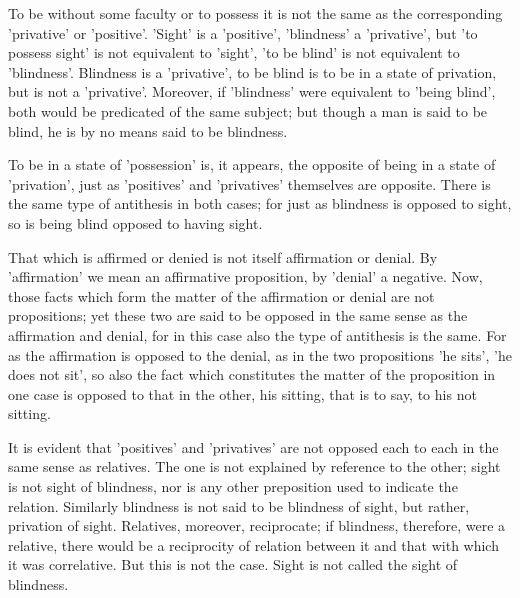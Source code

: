 To be without some faculty or to possess it is not the same as the
corresponding 'privative' or 'positive'. 'Sight' is a 'positive',
'blindness' a 'privative', but 'to possess sight' is not equivalent to
'sight', 'to be blind' is not equivalent to 'blindness'. Blindness is a
'privative', to be blind is to be in a state of privation, but is not a
'privative'. Moreover, if 'blindness' were equivalent to 'being blind',
both would be predicated of the same subject; but though a man is said
to be blind, he is by no means said to be blindness.

To be in a state of 'possession' is, it appears, the opposite of being
in a state of 'privation', just as 'positives' and 'privatives'
themselves are opposite. There is the same type of antithesis in both
cases; for just as blindness is opposed to sight, so is being blind
opposed to having sight.

That which is affirmed or denied is not itself affirmation or denial.
By 'affirmation' we mean an affirmative proposition, by 'denial' a
negative. Now, those facts which form the matter of the affirmation or
denial are not propositions; yet these two are said to be opposed in
the same sense as the affirmation and denial, for in this case also the
type of antithesis is the same. For as the affirmation is opposed to
the denial, as in the two propositions 'he sits', 'he does not sit', so
also the fact which constitutes the matter of the proposition in one
case is opposed to that in the other, his sitting, that is to say, to
his not sitting.

It is evident that 'positives' and 'privatives' are not opposed each to
each in the same sense as relatives. The one is not explained by
reference to the other; sight is not sight of blindness, nor is any
other preposition used to indicate the relation. Similarly blindness is
not said to be blindness of sight, but rather, privation of sight.
Relatives, moreover, reciprocate; if blindness, therefore, were a
relative, there would be a reciprocity of relation between it and that
with which it was correlative. But this is not the case. Sight is not
called the sight of blindness.

